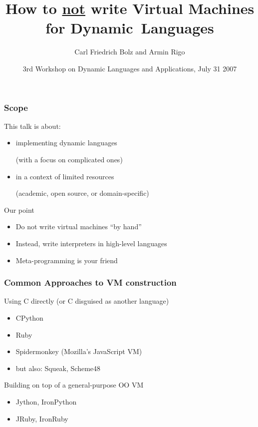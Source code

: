 \documentclass[utf8x]{beamer}
\title{How to \underline{not} write Virtual Machines for \mbox{Dynamic Languages}}
\author{Carl Friedrich Bolz and Armin Rigo}
\institute[Heinrich-Heine-Universität Düsseldorf]
{
  Institut für Informatik\\
  Heinrich-Heine-Universität Düsseldorf
}
\date{3rd Workshop on Dynamic Languages and Applications, July 31 2007}
\begin{document}
\begin{frame}
  \titlepage
\end{frame}


\begin{frame}
  \frametitle{Scope}
  This talk is about:

  \begin{itemize}
  \item
    implementing dynamic languages \par(with a focus on complicated ones)
  \item
    in a context of limited resources \par(academic, open source, or
    domain-specific)
  \end{itemize}
  \pause
  \begin{block}{
    Our point}
    \begin{itemize}
    \item
      Do not write virtual machines ``by hand''
    \item
      Instead, write interpreters in high-level languages
    \item
      Meta-programming is your friend
    \end{itemize}
  \end{block}
\end{frame}


\begin{frame}
  \frametitle{Common Approaches to VM construction}
  \begin{block}{
    Using C directly (or C disguised as another language)}
    \begin{itemize}
    \item
      CPython
    \item
      Ruby
    \item
      Spidermonkey (Mozilla's JavaScript VM)
    \item
      but also: Squeak, Scheme48
    \end{itemize}
  \end{block}
  \begin{block}{
    Building on top of a general-purpose OO VM}
    \begin{itemize}
    \item
      Jython, IronPython
    \item
      JRuby, IronRuby
    \end{itemize}
  \end{block}
\end{frame}
\end{document}
